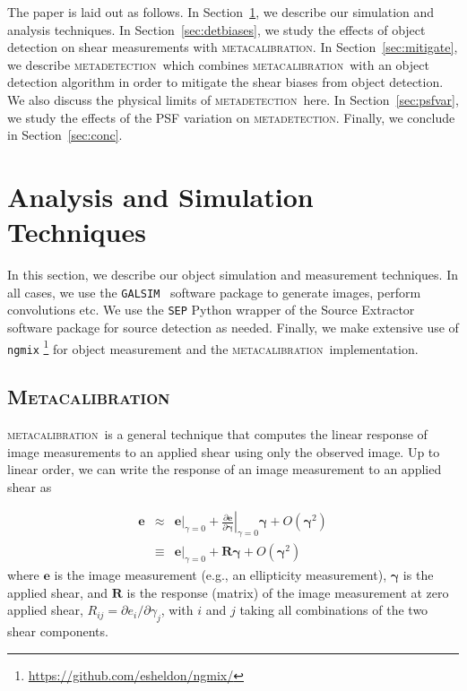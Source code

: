 \documentclass[fleqn,useAMS,usenatbib]{mnras}
\newcommand{\galsim}{\texttt{GALSIM}}
\newcommand{\ngmix}{\texttt{ngmix}}
\newcommand{\mcal}{\textsc{metacalibration}}
\newcommand{\mdet}{\textsc{metadetection}}
\begin{document}
The paper is laid out as follows. In Section~\ref{sec:sims}, we describe our
simulation and analysis techniques. In Section~\ref{sec:detbiases}, we study
the effects of object detection on shear measurements with \mcal.
In Section~\ref{sec:mitigate}, we describe \mdet\ which combines \mcal\ with
an object detection algorithm in order to mitigate the shear biases from object
detection. We also discuss the physical limits of \mdet\ here.
In Section~\ref{sec:psfvar}, we study the effects of the PSF variation on \mdet.
Finally, we conclude in Section~\ref{sec:conc}.

\section{Analysis and Simulation Techniques}
\label{sec:sims}

In this section, we describe our object simulation and measurement techniques.
In all cases, we use the \galsim\ \citep{GALSIM2015} software package to
generate images, perform convolutions etc. We use the \texttt{SEP} \citep{sep}
Python wrapper of the Source Extractor software package \citep{Bertin96} for
source detection as needed. Finally, we make extensive use of \ngmix
\footnote{\url{https://github.com/esheldon/ngmix/}} for object measurement and
the \mcal\ implementation.

\subsection{\textsc{Metacalibration}}
\label{sec:mcal}

\mcal\ is a general technique that computes the linear response of image
measurements to an applied shear using only the observed image. Up to linear
order, we can write the response of an image measurement to an applied shear as

\begin{eqnarray}
\boldsymbol{e} & \approx & \left.\boldsymbol{e}\right|_{\gamma=0} +
                           \left.\frac{\partial \boldsymbol{e}}{\partial\boldsymbol\gamma}\right|_{\gamma=0} \boldsymbol\gamma +
                           O(\boldsymbol\gamma^2)\nonumber\\
               & \equiv  & \left.\boldsymbol{e}\right|_{\gamma=0} +
                           \boldsymbol{R} \boldsymbol\gamma +
                           O(\boldsymbol\gamma^2)
\end{eqnarray}
where $\boldsymbol{e}$ is the image measurement (e.g., an ellipticity
measurement), $\boldsymbol\gamma$ is the applied shear, and $\boldsymbol{R}$ is
the response (matrix) of the image measurement at zero applied shear,
$R_{ij}=\partial e_i /\partial \gamma_j$, with $i$ and $j$ taking all
combinations of the two shear components.
\end{document}
